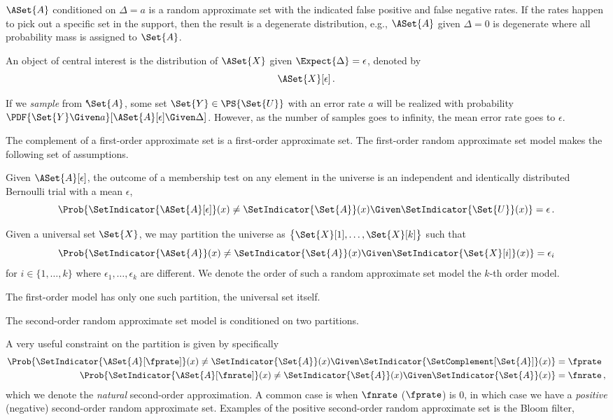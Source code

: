 \documentclass[ ../main.tex]{subfiles}
\begin{document}
$\ASet{A}$ conditioned on $\Delta = a$ is a random approximate set with the indicated false positive and false negative rates.
If the rates happen to pick out a specific set in the support, then the result is a degenerate distribution, e.g., $\ASet{A}$ given $\Delta = 0$ is degenerate where all probability mass is assigned to $\Set{A}$.

An object of central interest is the distribution of $\ASet{X}$ given $\Expect{\Delta} = \epsilon$, denoted by
\begin{equation}
\ASet{X}[\epsilon]\,.
\end{equation}

If we \emph{sample} from ${}^{\epsilon} \! \! \Set{A}$, some set $\Set{Y} \in \PS{\Set{U}}$ with an error rate $a$ will be realized with probability $\PDF{\Set{Y} \Given a}[\ASet{A}[\epsilon] \Given \Delta]$.
However, as the number of samples goes to infinity, the mean error rate goes to $\epsilon$.

The complement of a first-order approximate set is a first-order approximate set.
The first-order random approximate set model makes the following set of assumptions.
\begin{axiom}
\label{asm:err_rate}
Given $\ASet{A}[\epsilon]$, the outcome of a membership test on any element in the universe is an independent and identically distributed Bernoulli trial with a mean $\epsilon$,
\begin{equation}
\label{eq:axiom_err_rate}
    \Prob{\SetIndicator{\ASet{A}[\epsilon]}(x) \neq \SetIndicator{\Set{A}}(x) \Given \SetIndicator{\Set{U}}(x)} = \epsilon\,.
\end{equation}
\end{axiom}

Given a universal set $\Set{X}$, we may partition the universe as $\left\{\Set{X}[1],\ldots,\Set{X}[k]\right\}$ such that
\begin{equation}
\Prob{\SetIndicator{\ASet{A}}(x) \neq \SetIndicator{\Set{A}}(x) \Given \SetIndicator{\Set{X}[i]}(x)} = \epsilon_i
\end{equation}
for $i \in \{1,\ldots,k\}$ where $\epsilon_1,\ldots,\epsilon_k$ are different.
We denote the order of such a random approximate set model the $k$-th order model.

The first-order model has only one such partition, the universal set itself.

The second-order random approximate set model is conditioned on two partitions.

A very useful constraint on the partition is given by
specifically
\begin{align}
    \Prob{\SetIndicator{\ASet{A}[\fprate]}(x) \neq \SetIndicator{\Set{A}}(x) \Given \SetIndicator{\SetComplement[\Set{A}]}(x)} &= \fprate\\
    \Prob{\SetIndicator{\ASet{A}[\fnrate]}(x) \neq \SetIndicator{\Set{A}}(x) \Given \SetIndicator{\Set{A}}(x)} &= \fnrate\,,
\end{align}
which we denote the \emph{natural} second-order approximation.
A common case is when $\fnrate$ ($\fprate$) is $0$, in which case we have a \emph{positive} (negative) second-order random approximate set.
Examples of the positive second-order random approximate set is the Bloom filter, 
\end{document}
